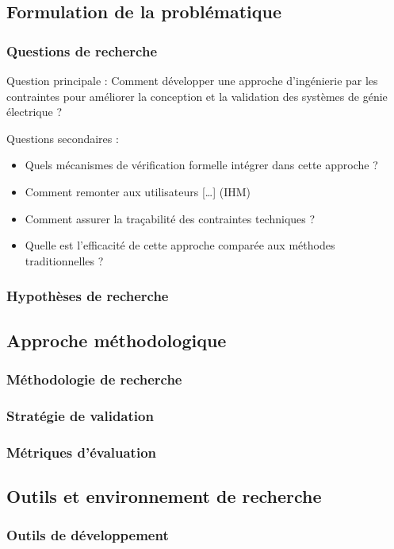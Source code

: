 \documentclass[a4paper,12pt]{article}
\begin{document}
\subsection{Formulation de la problématique}
\label{sec:orgd268b67}
\subsubsection{Questions de recherche}
\label{sec:org446c674}
Question principale : Comment développer une approche d'ingénierie par les contraintes pour améliorer la conception et la validation des systèmes de génie électrique ?

Questions secondaires :
\begin{itemize}
\item Quels mécanismes de vérification formelle intégrer dans cette approche ?
\item Comment remonter aux utilisateurs [\ldots{}] (IHM)
\item Comment assurer la traçabilité des contraintes techniques ?
\item Quelle est l'efficacité de cette approche comparée aux méthodes traditionnelles ?
\end{itemize}
\subsubsection{Hypothèses de recherche}
\label{sec:org31802d4}
\subsection{Approche méthodologique}
\label{sec:orgb9d23f5}
\subsubsection{Méthodologie de recherche}
\label{sec:org6b81365}
\subsubsection{Stratégie de validation}
\label{sec:org276a411}
\subsubsection{Métriques d'évaluation}
\label{sec:orgd1adc0a}
\subsection{Outils et environnement de recherche}
\label{sec:orga816438}
\subsubsection{Outils de développement}
\label{sec:org271b81a}
\end{document}
